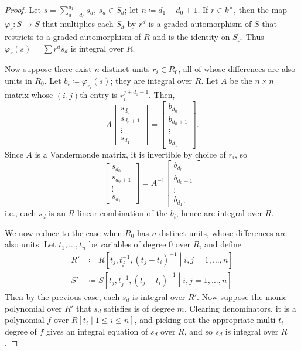 \documentclass[10pt]{article}
\theoremstyle{definition}
\theoremstyle{remark}
\numberwithin{equation}{section}
\numberwithin{figure}{subsubsection}
\begin{document}
\begin{proof}
  Let $s = \sum_{d=d_0}^{d_1} s_d$, $s_d \in S_d$; let $n \coloneqq d_1 - d_0 + 1$. If $r \in k^\times$, then the map $\varphi_r\colon S \to S$ that multiplies each $S_d$ by $r^d$ is a graded automorphism of $S$ that restricts to a graded automorphism of $R$ and is the identity on $S_0$. Thus $\varphi_r(s) = \sum r^ds_d$ is integral over $R$.
  \par Now suppose there exist $n$ distinct units $r_i \in R_0$, all of whose differences are also units in $R_0$. Let $b_i \coloneqq \varphi_{r_i}(s)$; they are integral over $R$. Let $A$ be the $n \times n$ matrix whose $(i,j)$th entry is $r_i^{j+d_0-1}$. Then,
  \begin{equation*}
    A\begin{bmatrix}
      s_{d_0}\\
      s_{d_0+1}\\
      \vdots\\
      s_{d_1}
    \end{bmatrix}
    = \begin{bmatrix}
      b_{d_0}\\
      b_{d_0+1}\\
      \vdots\\
      b_{d_1}
    \end{bmatrix}.
  \end{equation*}
  Since $A$ is a Vandermonde matrix, it is invertible by choice of $r_i$, so
  \begin{equation*}
    \begin{bmatrix}
      s_{d_0}\\
      s_{d_0+1}\\
      \vdots\\
      s_{d_1}
    \end{bmatrix}
    = A^{-1}\begin{bmatrix}
      b_{d_0}\\
      b_{d_0+1}\\
      \vdots\\
      b_{d_1},
    \end{bmatrix}
  \end{equation*}
  i.e., each $s_d$ is an $R$-linear combination of the $b_i$, hence are integral over $R$.
  \par We now reduce to the case when $R_0$ has $n$ distinct units, whose differences are also units. Let $t_1,\ldots,t_n$ be variables of degree $0$ over $R$, and define
  \begin{align*}
    R' &\coloneqq R\left[t_j,t_j^{-1},(t_j-t_i)^{-1} \middle\vert i,j = 1,\ldots,n\right]\\
    S' &\coloneqq S\left[t_j,t_j^{-1},(t_j-t_i)^{-1} \middle\vert i,j = 1,\ldots,n\right]
  \end{align*}
  Then by the previous case, each $s_d$ is integral over $R'$. Now suppose the monic polynomial over $R'$ that $s_d$ satisfies is of degree $m$. Clearing denominators, it is a polynomial $f$ over $R[t_i \mid 1 \le i \le n]$, and picking out the appropriate multi $t_i$-degree of $f$ gives an integral equation of $s_d$ over $R$, and so $s_d$ is integral over $R$.
\end{proof}
\end{document}
